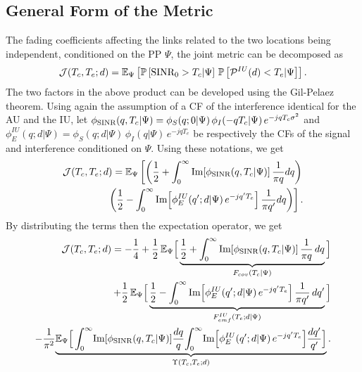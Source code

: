 {\subsection{General Form of the Metric}
\label{ssec:general_form}
The fading coefficients affecting the links related to the two locations being independent, conditioned on the PP $\Psi$, the joint metric can be decomposed as
\begin{equation*}
      \mathcal{J}(T_{c}, T_{e};d) = \mathbb E_{\Psi}\left[\mathbb{P}\left[\textrm{\normalfont SINR}_0 > T_{c}|\Psi\right]\,\mathbb{P}\left[ \mathcal{P}^{IU}(d) < T_{e}|\Psi\right]\right].  
\end{equation*}
The two factors in the above product can be developed using the Gil-Pelaez theorem. Using again the assumption of a CF of the interference identical for the AU and the IU, let $\phi_{\text{\normalfont{SINR}}}(q, T_c|\Psi)=\phi_{S}(q; 0 |\Psi)\,\phi_{I}(-q T_{c}|\Psi)\, e^{-j q T_{c} \sigma^2}$ and $\phi_E^{IU}(q;d|\Psi) = \phi_{S}(q; d|\Psi)\,\phi_{I}(q|\Psi)\, e^{-j q T_{e}}$ be respectively the CFs of the signal and interference conditioned on $\Psi$. Using these notations, we get
\begin{equation*}
\begin{split}
    \mathcal{J}(T_{c}, T_{e};d) = \mathbb E_{\Psi}\left[\left(\frac{1}{2}+ \int_0^\infty \textrm{\normalfont Im}\!\left[\phi_{\text{\normalfont{SINR}}}(q, T_c|\Psi)\right] \frac{1}{\pi q} dq\right)\right.\\
    \left.\left(\frac{1}{2}- \int_0^\infty \textrm{\normalfont Im}\!\left[\phi_E^{IU}(q';d|\Psi)\, e^{-j q' T_{e}}\right] \frac{1}{\pi q'} dq\right)\right].
\end{split}
\end{equation*}
By distributing the terms then the expectation operator, we get
{\footnotesize
\begin{equation*}
\begin{split}
    \mathcal{J}(T_{c}, T_{e};d) = -\frac{1}{4} + \frac{1}{2}\,\mathbb E_{\Psi}\Big[\underbrace{\frac{1}{2}+ \int_0^\infty \textrm{\normalfont Im}\!\left[\phi_{\text{\normalfont{SINR}}}(q, T_c|\Psi)\right] \frac{1}{\pi q}\, dq}_{F_{cov}(T_{c}|\Psi)}\Big]\\
    +\frac{1}{2}\,\mathbb E_{\Psi}\Big[\underbrace{\frac{1}{2}- \int_0^\infty \textrm{\normalfont Im}\!\left[\phi_E^{IU}(q';d |\Psi)\, e^{-j q' T_{e}}\right] \frac{1}{\pi q'}\, dq'}_{F_{emf}^{IU}(T_{e}; d|\Psi)}\Big]\\
    -\frac{1}{\pi^2}\!\underbrace{\mathbb E_{\Psi}\Big[\int_0^\infty \!\textrm{\normalfont Im}\!\left[\phi_{\text{\normalfont{SINR}}}(q, T_c|\Psi)\right] \! \frac{dq}{q} \! \int_0^\infty \!\textrm{\normalfont Im}\!\left[\phi_E^{IU}(q';d |\Psi)\, e^{-j q' T_{e}}\right]\! \frac{dq'}{q'}\Big]}_{\Upsilon(T_{c}, T_{e}; d)}.

\end{split}
\end{equation*}}}
